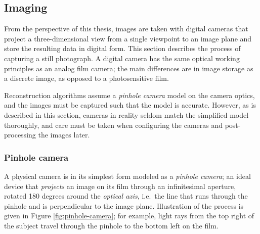 \subsection{Imaging} \label{sec:imaging} %

From the perspective of this thesis, images are taken with digital cameras that project a three-dimensional view from a single viewpoint to an image plane and store the resulting data in digital form.
This section describes the process of capturing a still photograph.
A digital camera has the same optical working principles as an analog film camera;
the main differences are in image storage as a discrete image, as opposed to a photosensitive film.

Reconstruction algorithms assume a \emph{pinhole camera} model on the camera optics, and the images must be captured such that the model is accurate.
However, as is described in this section, cameras in reality seldom match the simplified model thoroughly, and care must be taken when configuring the cameras and post-processing the images later.


\subsubsection{Pinhole camera} \label{sec:pinhole} %




A physical camera is in its simplest form modeled as a \emph{pinhole camera}; an ideal device that \emph{projects} an image on its film through an infinitesimal aperture, rotated 180 degrees around the \emph{optical axis}, i.e.\ the line that runs through the pinhole and is perpendicular to the image plane.
\cite{greenleaf1950photographic,kingslake1989history}
Illustration of the process is given in Figure \ref{fig:pinhole-camera}; for example, light rays from the top right of the subject travel through the pinhole to the bottom left on the film.

